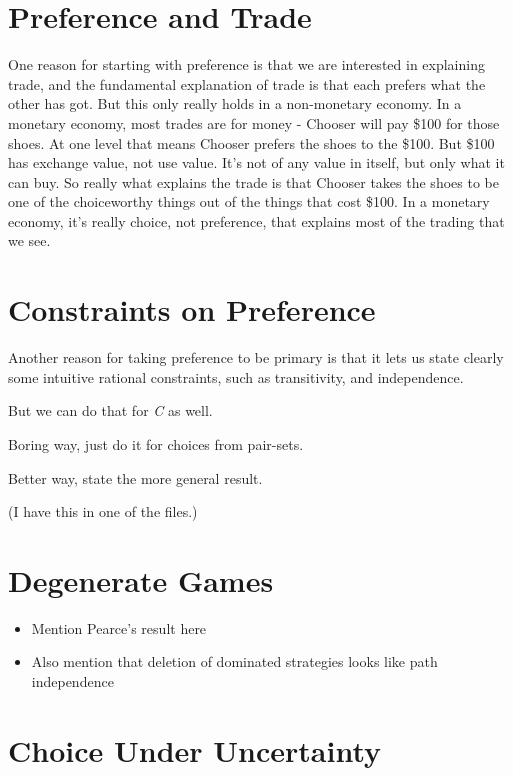 \documentclass[
  11pt,
  letterpaper,
  DIV=11,
  numbers=noendperiod,
  twoside]{scrartcl}
\providecommand{\tightlist}{%
  \setlength{\itemsep}{0pt}\setlength{\parskip}{0pt}}
\begin{document}
\section{Preference and Trade}\label{sec-trade}

One reason for starting with preference is that we are interested in
explaining trade, and the fundamental explanation of trade is that each
prefers what the other has got. But this only really holds in a
non-monetary economy. In a monetary economy, most trades are for money -
Chooser will pay \$100 for those shoes. At one level that means Chooser
prefers the shoes to the \$100. But \$100 has exchange value, not use
value. It's not of any value in itself, but only what it can buy. So
really what explains the trade is that Chooser takes the shoes to be one
of the choiceworthy things out of the things that cost \$100. In a
monetary economy, it's really choice, not preference, that explains most
of the trading that we see.

\section{Constraints on Preference}\label{sec-constraints}

Another reason for taking preference to be primary is that it lets us
state clearly some intuitive rational constraints, such as transitivity,
and independence.

But we can do that for \emph{C} as well.

Boring way, just do it for choices from pair-sets.

Better way, state the more general result.

(I have this in one of the files.)

\section{Degenerate Games}\label{sec-games}

\begin{itemize}
\tightlist
\item
  Mention Pearce's result here
\item
  Also mention that deletion of dominated strategies looks like path
  independence
\end{itemize}

\section{Choice Under Uncertainty}\label{sec-uncertainty}
\end{document}
